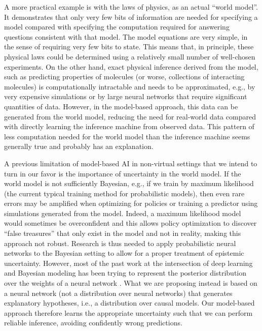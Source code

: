 A more practical example is with the laws of physics, as an actual ``world model''. It demonstrates that only very few bits of information are needed for specifying a model compared with specifying the computation required for answering questions consistent with that model. The model equations are very simple, in the sense of requiring very few bits to state. This means that, in principle, these physical laws could be determined using a relatively small number of well-chosen experiments. On the other hand, exact physical inference derived from the model, such as predicting properties of molecules (or worse, collections of interacting molecules) is computationally intractable and needs to be approximated, e.g., by very expensive simulations or by large neural networks \cite{www.nature.com.articles.s41586.024.07744.y,royalsocietypublishing.org.doi.full.10.1098.rsta.2020.0093,www.sciencedirect.com.science.article.abs.pii.S0045782522003152,pubs.aip.org.aip.pof.article.abstract.33.8.087101.1080391.Simulation.of.multi.species.flow.and.heat.transfer.redirectedFrom.fulltext,proceedings.mlr.press.v139.finzi21a} that require significant quantities of data. However, in the model-based approach, this data can be generated from the world model, reducing the need for real-world data compared with directly learning the inference machine from observed data. This pattern of less computation needed for the world model than the inference machine seems generally true and probably has an explanation.

A previous limitation of model-based AI in non-virtual settings that we intend to turn in our favor is the importance of uncertainty in the world model. If the world model is not sufficiently Bayesian, e.g., if we train by maximum likelihood (the current typical training method for probabilistic models), then even rare errors may be amplified when optimizing for policies or training a predictor using simulations generated from the model. Indeed, a maximum likelihood model would sometimes be overconfident and this allows policy optimization to discover ``false treasures'' that only exist in the model and not in reality, making this approach not robust. Research is thus needed to apply probabilistic neural networks to the Bayesian setting to allow for a proper treatment of epistemic uncertainty. However, most of the past work at the intersection of deep learning and Bayesian modeling has been trying to represent the posterior distribution over the weights of a neural network \cite{proceedings.mlr.press.v37.blundell15,link.springer.com.chapter.10.1007.978.3.030.42553.1.3}. What we are proposing instead is based on a neural network (not a distribution over neural networks) that generates explanatory hypotheses, i.e., a distribution over causal models. Our model-based approach therefore learns the appropriate uncertainty such that we can perform reliable inference, avoiding confidently wrong predictions.


